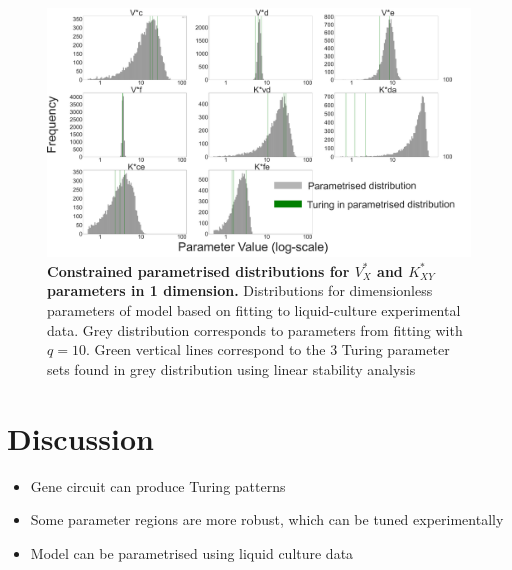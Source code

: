 \begin{figure}[H] %
    \centering
    \begin{adjustbox}{center}
        \includegraphics[width=1\textwidth]{chapters/Chapter 2/1d_distributions} %
    \end{adjustbox}
    \caption{\textbf{Constrained parametrised distributions for $V^*_X$ and $K^*_{XY}$ parameters in 1 dimension.} Distributions for dimensionless parameters of model based on fitting to liquid-culture experimental data. Grey distribution corresponds to parameters from fitting with $q=10$. Green vertical lines correspond to the 3 Turing parameter sets found in grey distribution using linear stability analysis }
    \label{fig:1d_distributions} %
\end{figure}

\section{Discussion}
\begin{itemize}
    \item Gene circuit can produce Turing patterns
    \item Some parameter regions are more robust, which can be tuned experimentally
    \item Model can be parametrised using liquid culture data
\end{itemize}

